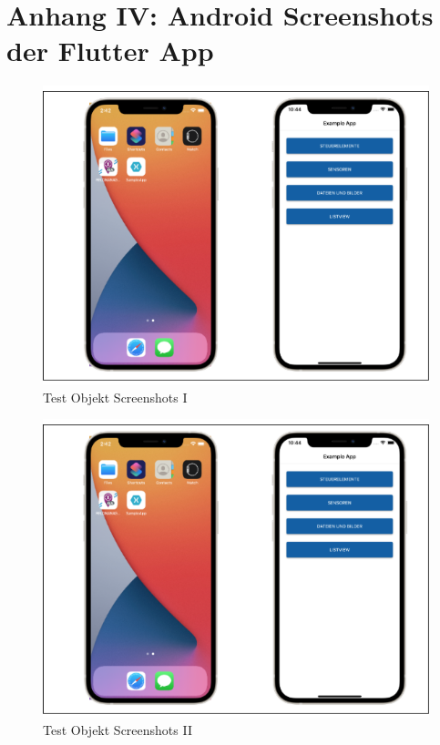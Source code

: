 \chapter{Anhang IV: Android Screenshots der Flutter App}
\label{chap:AnhangAndroidScreenshotsFlutter}


\begin{figure}[!ht]
 \includegraphics[width=\textwidth,keepaspectratio]{Images/Screenshot/AppIconAndMenu.png}
 \caption[]{Test Objekt Screenshots I}
\end{figure}

\begin{figure}[!ht]
 \includegraphics[width=\textwidth,keepaspectratio]{Images/Screenshot/AppIconAndMenu.png}
 \caption[]{Test Objekt Screenshots II}
\end{figure}

